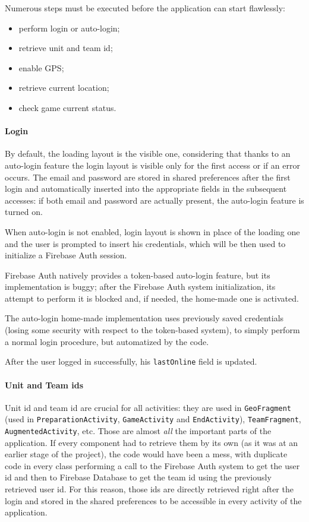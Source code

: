 			Numerous steps must be executed before the application can start flawlessly:
			\begin{itemize}
				\item perform login or auto-login;
				\item retrieve unit and team id;
				\item enable GPS;
				\item retrieve current location;
				\item check game current status.
			\end{itemize}
			
			\paragraph{Login}
			By default, the loading layout is the visible one, considering that thanks to an auto-login feature the login layout is visible only for the first access or if an error occurs.
			The email and password are stored in shared preferences after the first login and automatically inserted into the appropriate fields in the subsequent accesses: if both email and password are actually present, the auto-login feature is turned on.
			
			When auto-login is not enabled, login layout is shown in place of the loading one and the user is prompted to insert his credentials, which will be then used to initialize a Firebase Auth session.
			
			Firebase Auth natively provides a token-based auto-login feature, but its implementation is buggy; after the Firebase Auth system initialization, its attempt to perform it is blocked and, if needed, the home-made one is activated.
			
			The auto-login home-made implementation uses previously saved credentials (losing some security with respect to the token-based system), to simply perform a normal login procedure, but automatized by the code.
			
			After the user logged in successfully, his \lstinline|lastOnline| field is updated.
			
			\paragraph{Unit and Team ids}
			
			Unit id and team id are crucial for all activities: they are used in \lstinline|GeoFragment| (used in \lstinline|PreparationActivity|, \lstinline|GameActivity| and \lstinline|EndActivity|), \lstinline|TeamFragment|, \lstinline|AugmentedActivity|, etc. Those are almost \emph{all} the important parts of the application.
			If every component had to retrieve them by its own (as it was at an earlier stage of the project), the code would have been a mess, with duplicate code in every class performing a call to the Firebase Auth system to get the user id and then to Firebase Database to get the team id using the previously retrieved user id.
			For this reason, those ids are directly retrieved right after the login and stored in the shared preferences to be accessible in every activity of the application.
			
